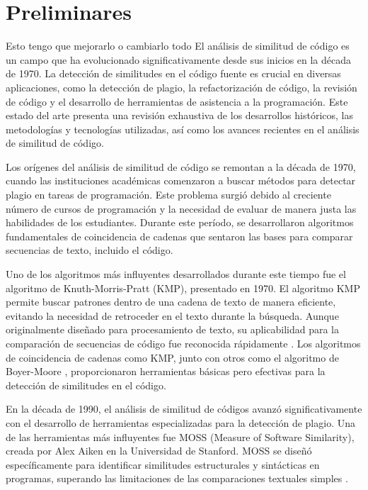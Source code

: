 \chapter{Preliminares}\label{chapter:state-of-the-art}
Esto  tengo que mejorarlo o cambiarlo todo
El análisis de similitud de código es un campo que ha evolucionado significativamente desde sus inicios en la década de 1970. La detección de similitudes en el código fuente es crucial en diversas aplicaciones, como la detección de plagio, la refactorización de código, la revisión de código y el desarrollo de herramientas de asistencia a la programación. Este estado del arte presenta una revisión exhaustiva de los desarrollos históricos, las metodologías y tecnologías utilizadas, así como los avances recientes en el análisis de similitud de código.

Los orígenes del análisis de similitud de código se remontan a la década de 1970, cuando las instituciones académicas comenzaron a buscar métodos para detectar plagio en tareas de programación. Este problema surgió debido al creciente número de cursos de programación y la necesidad de evaluar de manera justa las habilidades de los estudiantes. Durante este período, se desarrollaron algoritmos fundamentales de coincidencia de cadenas que sentaron las bases para comparar secuencias de texto, incluido el código.

Uno de los algoritmos más influyentes desarrollados durante este tiempo fue el algoritmo de Knuth-Morris-Pratt (KMP), presentado en 1970. El algoritmo KMP permite buscar patrones dentro de una cadena de texto de manera eficiente, evitando la necesidad de retroceder en el texto durante la búsqueda. Aunque originalmente diseñado para procesamiento de texto, su aplicabilidad para la comparación de secuencias de código fue reconocida rápidamente \cite{knuth1977fast}. Los algoritmos de coincidencia de cadenas como KMP, junto con otros como el algoritmo de Boyer-Moore \cite{boyer1977fast}, proporcionaron herramientas básicas pero efectivas para la detección de similitudes en el código.

En la década de 1990, el análisis de similitud de códigos avanzó significativamente con el desarrollo de herramientas especializadas para la detección de plagio. Una de las herramientas más influyentes fue MOSS (Measure of Software Similarity), creada por Alex Aiken en la Universidad de Stanford. MOSS se diseñó específicamente para identificar similitudes estructurales y sintácticas en programas, superando las limitaciones de las comparaciones textuales simples \cite{aiken1994moss}.

